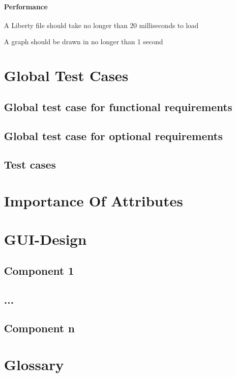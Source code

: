 \documentclass[10pt,a4paper]{report}
\begin{document}
\subsubsection{Performance}
\begin{NFRO-Perf}
    \item A Liberty file should take no longer than 20 milliseconds to load
    \item A graph should be drawn in no longer than 1 second
\end{NFRO-Perf}

\chapter{Global Test Cases}
\section{Global test case for functional requirements}
\section{Global test case for optional requirements}
\section{Test cases}
\chapter{Importance Of Attributes}

\chapter{GUI-Design}
\section{Component 1}
\section{...}
\section{Component n}

\chapter{Glossary}
\end{document}

